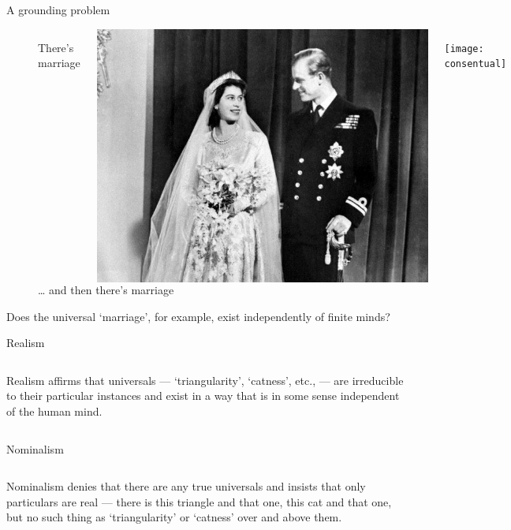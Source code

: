 \documentclass[xcolor=dvipsnames]{beamer}
\begin{document}
\begin{frame}{A grounding problem}
\begin{figure}
  \centering
  \begin{columns}
    \centering
    \caption {There's marriage}
    \includegraphics[width=0.99\textwidth]{conjugal}
    \centering
    \caption {{\ldots} and then there's marriage}
    \texttt{[image: consentual]}
  \end{columns}
\end{figure}
  Does the universal `marriage', for example, exist independently of finite minds?
\end{frame}


\begin{frame}{Realism}
  \begin{columns}
Realism affirms that universals --- `triangularity', `catness', etc., --- are irreducible to their particular instances and exist in a way that is in some sense independent of the human mind.
  \end{columns}
\end{frame}


\begin{frame}{Nominalism}
  \begin{columns}
Nominalism denies that there are any true universals and insists that only particulars are real --- there is this triangle and that one, this cat and that one, but no such thing as `triangularity' or `catness' over and above them.
  \end{columns}
\end{frame}
\end{document}
